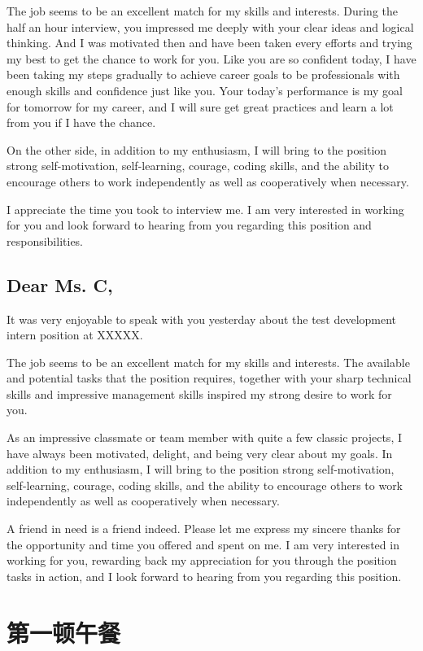 \documentclass[12pt]{book}
\begin{document}
The job seems to be an excellent match for my skills and interests. During the half an hour interview, you impressed me deeply with your clear ideas and logical thinking. And I was motivated then and have been taken every efforts and trying my best to get the chance to work for you. Like you are so confident today, I have been taking my steps gradually to achieve career goals to be professionals with enough skills and confidence just like you. Your today's performance is my goal for tomorrow for my career, and I will sure get great practices and learn a lot from you if I have the chance.

On the other side, in addition to my enthusiasm, I will bring to the position strong self-motivation, self-learning, courage, coding skills, and the ability to encourage others to work independently as well as cooperatively when necessary.

I appreciate the time you took to interview me. I am very interested in working for you and look forward to hearing from you regarding this position and responsibilities.

\subsection{Dear Ms. C,}
\label{sec-5-2-3}

It was very enjoyable to speak with you yesterday about the test development intern position at XXXXX.

The job seems to be an excellent match for my skills and interests. The available and potential tasks that the position requires, together with your sharp technical skills and impressive management skills inspired my strong desire to work for you.

As an impressive classmate or team member with quite a few classic projects, I have always been motivated, delight, and being very clear about my goals. In addition to my enthusiasm, I will bring to the position strong self-motivation, self-learning, courage, coding skills, and the ability to encourage others to work independently as well as cooperatively when necessary.

A friend in need is a friend indeed. Please let me express my sincere thanks for the opportunity and time you offered and spent on me. I am very interested in working for you, rewarding back my appreciation for you through the position tasks in action, and I look forward to hearing from you regarding this position.

\section{第一顿午餐}
\label{sec-5-3}
\end{document}
